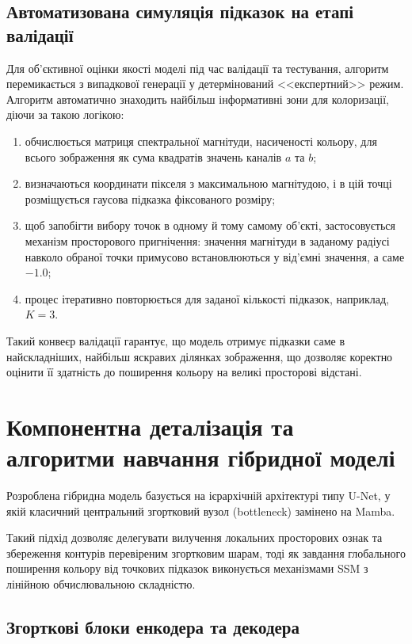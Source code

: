         \subsection{Автоматизована симуляція підказок на етапі валідації}
            Для об'єктивної оцінки якості моделі під час валідації та тестування, алгоритм перемикається з випадкової генерації у детермінований <<експертний>> режим. Алгоритм автоматично знаходить найбільш інформативні зони для колоризації, діючи за такою логікою:
            \begin{enumerate}
                \item обчислюється матриця спектральної магнітуди, насиченості кольору, для всього зображення як сума квадратів значень каналів $a$ та $b$;
                \item визначаються координати пікселя з максимальною магнітудою, і в цій точці розміщується гаусова підказка фіксованого розміру;
                \item щоб запобігти вибору точок в одному й тому самому об'єкті, застосовується механізм просторового пригнічення: значення магнітуди в заданому радіусі навколо обраної точки примусово встановлюються у від'ємні значення, а саме $-1.0$;
                \item процес ітеративно повторюється для заданої кількості підказок, наприклад, $K=3$.
            \end{enumerate}
            Такий конвеєр валідації гарантує, що модель отримує підказки саме в найскладніших, найбільш яскравих ділянках зображення, що дозволяє коректно оцінити її здатність до поширення кольору на великі просторові відстані.

    \section{Компонентна деталізація та алгоритми навчання гібридної моделі}
        Розроблена гібридна модель базується на ієрархічній архітектурі типу U-Net,
        у якій класичний центральний згортковий вузол (bottleneck) замінено на Mamba.
        
        Такий підхід дозволяє делегувати вилучення локальних просторових ознак та збереження контурів перевіреним згортковим шарам,
        тоді як завдання глобального поширення кольору від точкових підказок виконується механізмами SSM з лінійною обчислювальною складністю.

        \subsection{Згорткові блоки енкодера та декодера}
    
